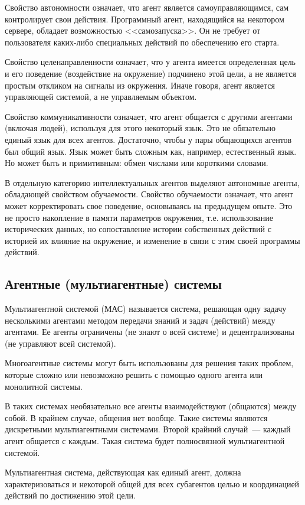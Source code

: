 Свойство автономности означает, что агент является самоуправляющимся, сам контролирует свои действия. Программный агент, находящийся на некотором сервере, обладает возможностью <<самозапуска>>. Он не требует от пользователя каких-либо специальных действий по обеспечению его старта.

Свойство целенаправленности означает, что у агента имеется определенная цель и его поведение (воздействие на окружение) подчинено этой цели, а не является простым откликом на сигналы из окружения. Иначе говоря, агент является управляющей системой, а не управляемым объектом.

Свойство коммуникативности означает, что агент общается с другими агентами (включая людей), используя для этого некоторый язык. Это не обязательно единый язык для всех агентов. Достаточно, чтобы у пары общающихся агентов был общий язык. Язык может быть сложным как, например, естественный язык. Но может быть и примитивным: обмен числами или короткими словами.

В отдельную категорию интеллектуальных агентов выделяют автономные агенты, обладающей свойством обучаемости. Свойство обучаемости означает, что агент может корректировать свое поведение, основываясь на предыдущем опыте. Это не просто накопление в памяти параметров окружения, т.е. использование исторических данных, но сопоставление истории собственных действий с историей их влияние на окружение, и изменение в связи с этим своей программы действий.

\subsection{Агентные (мультиагентные) системы}
Мультиагентной системой (МАС) называется система, решающая одну задачу несколькими агентами методом передачи знаний и задач (действий) между агентами. Ее агенты ограничены (не знают о всей системе) и децентрализованы (не управляют всей системой).

Многоагентные системы могут быть использованы для решения таких проблем, которые сложно или невозможно решить с помощью одного агента или монолитной системы.

В таких системах необязательно все агенты взаимодействуют (общаются) между собой. В крайнем случае, общения нет вообще. Такие системы являются дискретными мультиагентными системами. Второй крайний случай~--- каждый агент общается с каждым. Такая система будет полносвязной мультиагентной системой.

Мультиагентная система, действующая как единый агент, должна характеризоваться и некоторой общей для всех субагентов целью и координацией действий по достижению этой цели.

